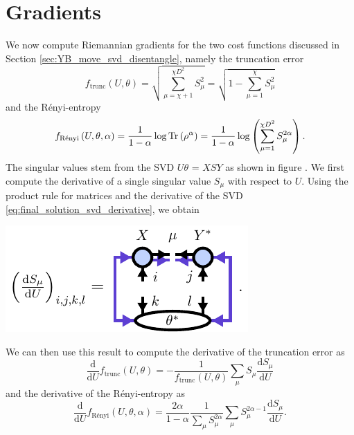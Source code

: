 \section{Gradients}
%
%
\label{sec:renyi_trunc_gradients}
We now compute Riemannian gradients for the two cost functions discussed in Section \ref{sec:YB_move_svd_disentangle}, namely the truncation error
\begin{equation}
	\label{eq:appendix_trunc_error_cost_function}
	f_\text{trunc}\left(U,\theta\right) = \sqrt{\sum_{\mu = \chi+1}^{\chi D^2}S_\mu^2} = \sqrt{1 - \sum_{\mu = 1}^{\chi}S_\mu^2}
\end{equation}
and the Rényi-entropy
\begin{equation}
	\label{eq:appendix_renyi_cost_function}
	f_\text{Rényi}\left(U,\theta,\alpha\right) = \frac{1}{1-\alpha}\log\operatorname{Tr}\left(\rho^\alpha\right) = \frac{1}{1-\alpha}\log\left(\sum_{\mu=1}^{\chi D^2}S_\mu^{2\alpha}\right).
\end{equation}
The singular values stem from the SVD $U\theta$ = $XSY$ as shown in figure . We first compute the derivative of a single singular value $S_\mu$ with respect to $U$. Using the product rule for matrices \cite{cite:the_matrix_cook_book} and the derivative of the SVD \eqref{eq:final_solution_svd_derivative}, we obtain
\begin{center}
	\includegraphics[scale=1]{figures/tikz/gradient_and_hvp/derivative_of_s_mu/derivative_of_s_mu.pdf}
\end{center}
We can then use this result to compute the derivative of the truncation error as
\begin{equation}
	\frac{\text{d}}{\text{d}U}f_\text{trunc}(U,\theta) = -\frac{1}{f_\text{trunc}(U,\theta)}\sum_\mu S_\mu \frac{\text{d}S_\mu}{\text{d}U}
\end{equation}
and the derivative of the Rényi-entropy as
\begin{equation}
	\frac{\text{d}}{\text{d}U}f_\text{Rényi}(U,\theta,\alpha) = \frac{2\alpha}{1-\alpha}\frac{1}{\sum_\mu S_\mu^{2\alpha}} \sum_\mu S_\mu^{2\alpha-1}\frac{\text{d}S_\mu}{\text{d}U}.
\end{equation}
